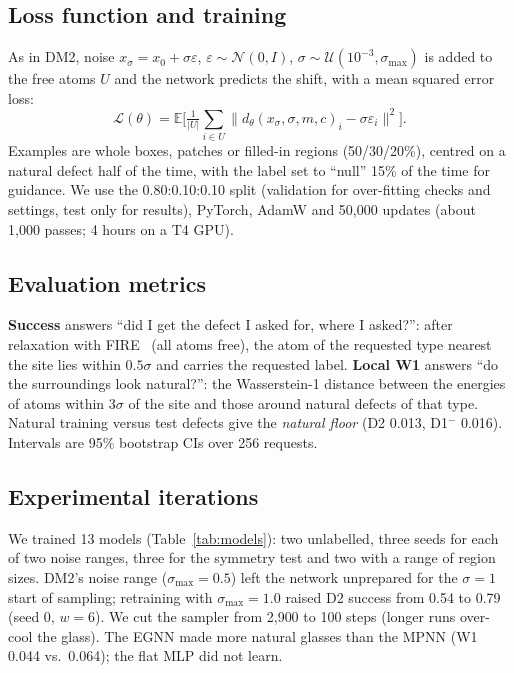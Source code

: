 \documentclass[10pt]{article}
\newcommand{\Dm}{D1$^{-}$}
\begin{document}
\subsection{Loss function and training}
As in DM2, noise $x_\sigma=x_0+\sigma\varepsilon$, $\varepsilon\sim\mathcal N(0,I)$, $\sigma\sim\mathcal U(10^{-3},\sigma_\text{max})$ is added to the free atoms $U$ and the network predicts the shift, with a mean squared error loss:
\begin{equation}
\mathcal L(\theta)=\mathbb E\Big[\tfrac{1}{|U|}\textstyle\sum_{i\in U}\big\lVert d_\theta(x_\sigma,\sigma,m,c)_i-\sigma\varepsilon_i\big\rVert^2\Big].
\end{equation}
Examples are whole boxes, patches or filled-in regions (50/30/20\%), centred on a natural defect half of the time, with the label set to ``null'' 15\% of the time for guidance. We use the 0.80:0.10:0.10 split (validation for over-fitting checks and settings, test only for results), PyTorch, AdamW and 50,000 updates (about 1,000 passes; 4 hours on a T4 GPU).

\subsection{Evaluation metrics}
\label{sec:metrics}
\textbf{Success} answers ``did I get the defect I asked for, where I asked?'': after relaxation with FIRE~\citep{bitzek2006fire} (all atoms free), the atom of the requested type nearest the site lies within $0.5\sigma$ and carries the requested label. \textbf{Local W1} answers ``do the surroundings look natural?'': the Wasserstein-1 distance between the energies of atoms within $3\sigma$ of the site and those around natural defects of that type. Natural training versus test defects give the \emph{natural floor} (D2 0.013, \Dm{} 0.016). Intervals are 95\% bootstrap CIs over 256 requests.

\subsection{Experimental iterations}
We trained 13 models (Table~\ref{tab:models}): two unlabelled, three seeds for each of two noise ranges, three for the symmetry test and two with a range of region sizes. DM2's noise range ($\sigma_\text{max}=0.5$) left the network unprepared for the $\sigma=1$ start of sampling; retraining with $\sigma_\text{max}=1.0$ raised D2 success from 0.54 to 0.79 (seed 0, $w=6$). We cut the sampler from 2,900 to 100 steps (longer runs over-cool the glass). The EGNN made more natural glasses than the MPNN (W1 0.044 vs.\ 0.064); the flat MLP did not learn.
\end{document}
